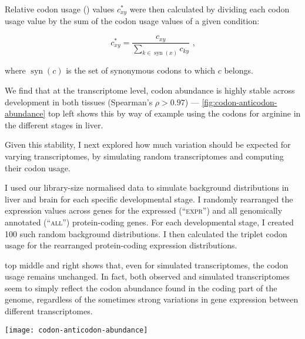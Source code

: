 Relative codon usage (\rcu) values \(c_{xy}^*\) were then calculated by dividing
each codon usage value by the sum of the codon usage values of a given
condition:

\begin{equation}
    c_{xy}^* = \frac{c_{xy}}{\sum_{k\in \operatorname{syn}(x)} c_{ky}} \text{\ ,}
\end{equation}

where \(\operatorname{syn}(c)\) is the set of synonymous codons to which \(c\)
belongs.

We find that at the transcriptome level, codon abundance is highly stable across
development in both tissues (Spearman’s \(\rho > 0.97\)) ---
\cref{fig:codon-anticodon-abundance} top left shows this by way of example using
the codons for arginine in the different stages in liver.

Given this stability, I next explored how much variation should be expected for
varying transcriptomes, by simulating random transcriptomes and computing their
codon usage.

I used our library-size normalised \rnaseq data to simulate background
distributions in liver and brain for each specific developmental stage. I
randomly rearranged the expression values across genes for the expressed
(“\textsc{expr}”) and all genomically annotated (“\textsc{all}”) protein-coding
genes. For each developmental stage, I created \num{100} such random background
distributions. I then calculated the triplet codon usage for the rearranged
protein-coding \rna expression distributions.

 top middle and right shows that, even for
simulated transcriptomes, the codon usage remains unchanged. In fact, both
observed and simulated transcriptomes seem to simply reflect the codon abundance
found in the coding part of the genome, regardless of the sometimes strong
variations in gene expression between different transcriptomes.

\begingroup%
    {\ifoddpage\else\raggedleft\fi%
    \texttt{[image: codon-anticodon-abundance]}}{}

